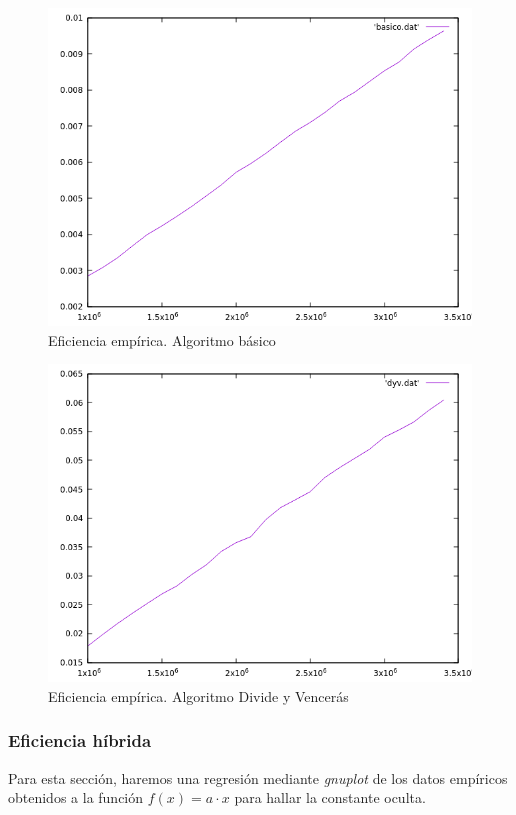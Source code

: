 \documentclass[12pt,spanish]{article}
\begin{document}
\begin{figure}[H]
\centering
\includegraphics[scale=0.85]{empirica_basico.png}
\caption{Eficiencia empírica. Algoritmo básico}
\end{figure}

\begin{figure}[H]
\centering
\includegraphics[scale=0.85]{empirica_dyv.png}
\caption{Eficiencia empírica. Algoritmo Divide y Vencerás}
\end{figure}

\subsubsection{Eficiencia híbrida}
Para esta sección, haremos una regresión mediante \emph{gnuplot} de los datos empíricos obtenidos a la función $f(x)=a \cdot x$ para hallar la constante oculta.
\end{document}
